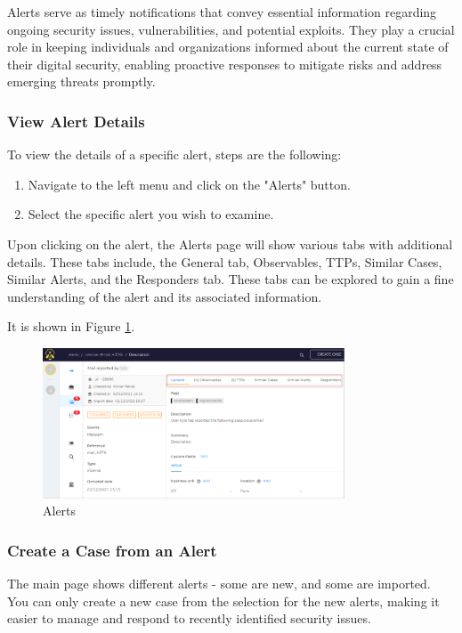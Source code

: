 \documentclass{article}
\begin{document}
Alerts serve as timely notifications that convey essential information regarding ongoing security issues, vulnerabilities, and potential exploits. They play a crucial role in keeping individuals and organizations informed about the current state of their digital security, enabling proactive responses to mitigate risks and address emerging threats promptly.

\subsubsection{View Alert Details}

To view the details of a specific alert, steps are the following:

\begin{enumerate}
  \item Navigate to the left menu and click on the "Alerts" button.
  \item Select the specific alert you wish to examine.
\end{enumerate}

Upon clicking on the alert, the Alerts page will show various tabs with additional details. These tabs include, the General tab, Observables, TTPs, Similar Cases, Similar Alerts, and the Responders tab. These tabs can be explored to gain a fine understanding of the alert and its associated information.

It is shown in Figure \ref{fig:alert}.

\begin{figure}[H]
    \centering
    \includegraphics[width=0.8\textwidth]{img25.png}
    \caption{Alerts}
    \label{fig:alert}
\end{figure}

\subsubsection{Create a Case from an Alert}

The main page shows different alerts - some are new, and some are imported. You can only create a new case from the selection for the new alerts, making it easier to manage and respond to recently identified security issues.
\end{document}
